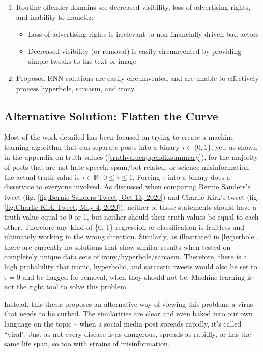 \documentclass[preprint,review,12pt]{elsarticle}
\begin{document}
\begin{enumerate}
\begin{itemize}
     \end{itemize}
     \item Routine offender domains see decreased visibility, loss of advertising rights, and inability to monetize
     \begin{itemize}
         \item Loss of advertising rights is irrelevant to non-financially driven bad actors
         \item Decreased visibility (or removal) is easily circumvented by providing simple tweaks to the text or image
     \end{itemize}
     \item Proposed RNN solutions are easily circumvented and are unable to effectively process hyperbole, sarcasm, and irony.
 \end{enumerate}
 
\subsection{Alternative Solution: Flatten the Curve}
\label{Flatten the Curve Section}
 Most of the work detailed has been focused on trying to create a machine learning algorithm that can separate posts into a binary $\tau \in \{0,1\}$, yet, as shown in the appendix on truth values (\ref{truthvalueappendixsummary}), for the majority of posts that are not hate speech, spam/bot related, or science misinformation the actual truth value is $\tau \in \mathbb{R} \ | \ 0 \leq \tau \leq 1$. Forcing $\tau$ into a binary does a disservice to everyone involved. As discussed when comparing Bernie Sanders's tweet (fig. \ref{fig:Bernie Sanders Tweet, Oct 13, 2020}) and  Charlie Kirk's tweet (fig. \ref{fig:Charlie Kirk Tweet, May 4, 2020}), neither of those statements should have a truth value equal to 0 or 1, but neither should their truth values be equal to each other. Therefore any kind of \{0, 1\} regression or classification is fruitless and ultimately working in the wrong direction. Similarly, as illustrated in \ref{hyperbole}, there are currently no solutions that show similar results when tested on completely unique data sets of irony/hyperbole/sarcasm. Therefore, there is a high probability that ironic, hyperbolic, and sarcastic tweets would also be set to $\tau = 0$ and be flagged for removal, when they should not be. Machine learning is not the right tool to solve this problem. 
 
 Instead, this thesis proposes an alternative way of viewing this problem: a virus that needs to be curbed. The similarities are clear and even baked into our own language on the topic -- when a social media post spreads rapidly, it's called ``viral". Just as not every disease is as dangerous, spreads as rapidly, or has the same life span, so too with strains of misinformation.
 
\end{document}
